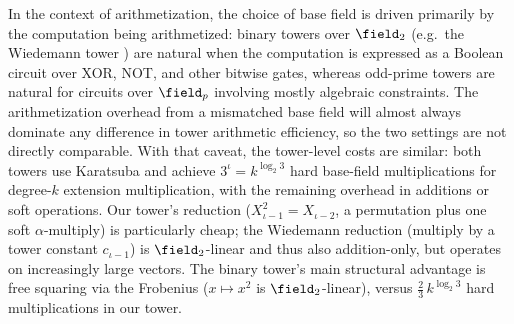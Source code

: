 In the context of arithmetization, the choice of base field is driven primarily by the computation being arithmetized: binary towers over $\field_2$ (e.g.\ the Wiedemann tower \cite{wiedemann1988iterated}) are natural when the computation is expressed as a Boolean circuit over XOR, NOT, and other bitwise gates, whereas odd-prime towers are natural for circuits over $\field_p$ involving mostly algebraic constraints. The arithmetization overhead from a mismatched base field will almost always dominate any difference in tower arithmetic efficiency, so the two settings are not directly comparable. With that caveat, the tower-level costs are similar: both towers use Karatsuba and achieve $3^\iota = k^{\log_2 3}$ hard base-field multiplications for degree-$k$ extension multiplication, with the remaining overhead in additions or soft operations. Our tower's reduction ($X_{\iota-1}^2 = X_{\iota-2}$, a permutation plus one soft $\alpha$-multiply) is particularly cheap; the Wiedemann reduction (multiply by a tower constant $c_{\iota-1}$) is $\field_2$-linear and thus also addition-only, but operates on increasingly large vectors. The binary tower's main structural advantage is free squaring via the Frobenius ($x\mapsto x^2$ is $\field_2$-linear), versus $\frac{2}{3}\,k^{\log_2 3}$ hard multiplications in our tower.
